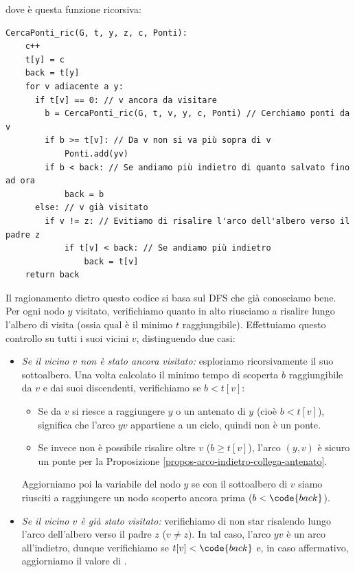 \documentclass[11pt, a4paper, titlepage, oneside]{scrbook}
\begin{document}
dove  è questa funzione ricorsiva:
\begin{lstlisting}[style=Python]
CercaPonti_ric(G, t, y, z, c, Ponti):
    c++
    t[y] = c
    back = t[y] 
    for v adiacente a y:
      if t[v] == 0: // v ancora da visitare
        b = CercaPonti_ric(G, t, v, y, c, Ponti) // Cerchiamo ponti da v
        if b >= t[v]: // Da v non si va più sopra di v
            Ponti.add(yv)
        if b < back: // Se andiamo più indietro di quanto salvato fino ad ora
            back = b
      else: // v già visitato
        if v != z: // Evitiamo di risalire l'arco dell'albero verso il padre z
            if t[v] < back: // Se andiamo più indietro
                back = t[v] 
    return back
\end{lstlisting}

Il ragionamento dietro questo codice si basa sul DFS che già conosciamo bene. Per ogni nodo $y$ visitato, verifichiamo quanto in alto riusciamo a risalire lungo l'albero di visita (ossia qual è il minimo $t$ raggiungibile). Effettuiamo questo controllo su tutti i suoi vicini $v$, distinguendo due casi:

\begin{itemize}
    \item \textit{Se il vicino $v$ non è stato ancora visitato:} esploriamo ricorsivamente il suo sottoalbero. Una volta calcolato il minimo tempo di scoperta $b$ raggiungibile da $v$ e dai suoi discendenti, verifichiamo se $b < t[v]$:
    \begin{itemize}
        \item Se da $v$ si riesce a raggiungere $y$ o un antenato di $y$ (cioè $b < t[v]$), significa che l'arco $yv$ appartiene a un ciclo, quindi non è un ponte.
        \item Se invece non è possibile risalire oltre $v$ ($b \ge t[v]$), l'arco $(y, v)$ è sicuro un ponte per la Proposizione \ref{propos-arco-indietro-collega-antenato}.
    \end{itemize}
    Aggiorniamo poi la variabile  del nodo $y$ se con il sottoalbero di $v$ siamo riusciti a raggiungere un nodo scoperto ancora prima ($b < \code{back}$).

    \item \textit{Se il vicino $v$ è già stato visitato:} verifichiamo di non star risalendo lungo l'arco dell'albero verso il padre $z$ ($v \neq z$). In tal caso, l'arco $yv$ è un arco all'indietro, dunque verifichiamo se $t[v] < \code{back}$ e, in caso affermativo, aggiorniamo il valore di .
\end{itemize}
\end{document}

